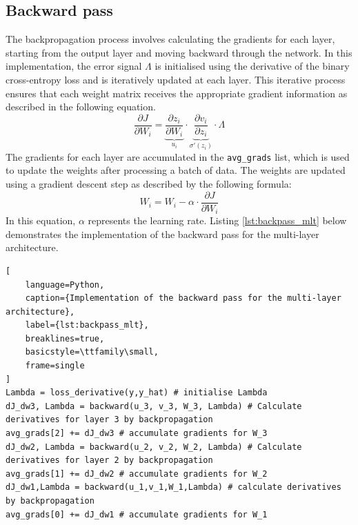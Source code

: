 \documentclass[11pt]{article}
\begin{document}
\subsection*{Backward pass}
The backpropagation process involves calculating the gradients for each layer, starting from the output layer and moving backward through the network. In this implementation, 
the error signal $\Lambda$ is initialised using the derivative of the binary cross-entropy loss and is iteratively updated at each layer. This iterative process ensures 
that each weight matrix receives the appropriate gradient information as described in the following equation.
\begin{equation}
    \frac{\partial J}{\partial W_i} = \underbrace{\frac{\partial z_i}{\partial W_i}}_{u_i} \cdot \underbrace{\frac{\partial v_i}{\partial z_i}}_{\sigma'(z_i)} \cdot {\Lambda}
    \label{eq:chain_rule_expansion}
\end{equation}
The gradients for each layer are accumulated in the \texttt{avg\_grads} list, which is used to update the weights after processing a batch of data. 
The weights are updated using a gradient descent step as described by the following formula:
\begin{equation}
    W_i = W_i - \alpha \cdot \frac{\partial J}{\partial W_i}
    \label{eq:weight_update}    
\end{equation}
In this equation, $\alpha$ represents the learning rate. Listing \ref{lst:backpass_mlt} below demonstrates the implementation of the backward pass for the multi-layer architecture.
\begin{lstlisting}[
    language=Python, 
    caption={Implementation of the backward pass for the multi-layer architecture},
    label={lst:backpass_mlt},
    breaklines=true,
    basicstyle=\ttfamily\small,
    frame=single
]
Lambda = loss_derivative(y,y_hat) # initialise Lambda
dJ_dw3, Lambda = backward(u_3, v_3, W_3, Lambda) # Calculate derivatives for layer 3 by backpropagation
avg_grads[2] += dJ_dw3 # accumulate gradients for W_3
dJ_dw2, Lambda = backward(u_2, v_2, W_2, Lambda) # Calculate derivatives for layer 2 by backpropagation
avg_grads[1] += dJ_dw2 # accumulate gradients for W_2
dJ_dw1,Lambda = backward(u_1,v_1,W_1,Lambda) # calculate derivatives by backpropagation
avg_grads[0] += dJ_dw1 # accumulate gradients for W_1
\end{lstlisting}
\end{document}
